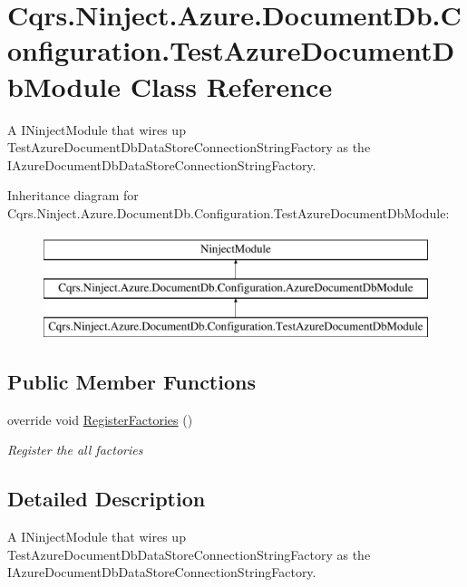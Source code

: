 \hypertarget{classCqrs_1_1Ninject_1_1Azure_1_1DocumentDb_1_1Configuration_1_1TestAzureDocumentDbModule}{}\section{Cqrs.\+Ninject.\+Azure.\+Document\+Db.\+Configuration.\+Test\+Azure\+Document\+Db\+Module Class Reference}
\label{classCqrs_1_1Ninject_1_1Azure_1_1DocumentDb_1_1Configuration_1_1TestAzureDocumentDbModule}


A I\+Ninject\+Module that wires up Test\+Azure\+Document\+Db\+Data\+Store\+Connection\+String\+Factory as the I\+Azure\+Document\+Db\+Data\+Store\+Connection\+String\+Factory.  


Inheritance diagram for Cqrs.\+Ninject.\+Azure.\+Document\+Db.\+Configuration.\+Test\+Azure\+Document\+Db\+Module\+:\begin{figure}[H]
\begin{center}
\leavevmode
\includegraphics[height=3.000000cm]{classCqrs_1_1Ninject_1_1Azure_1_1DocumentDb_1_1Configuration_1_1TestAzureDocumentDbModule}
\end{center}
\end{figure}
\subsection*{Public Member Functions}
\begin{DoxyCompactItemize}
\item 
override void \hyperlink{classCqrs_1_1Ninject_1_1Azure_1_1DocumentDb_1_1Configuration_1_1TestAzureDocumentDbModule_a9bd41611cfee1edc8a88815c366fccae_a9bd41611cfee1edc8a88815c366fccae}{Register\+Factories} ()
\begin{DoxyCompactList}\small\item\em Register the all factories \end{DoxyCompactList}\end{DoxyCompactItemize}


\subsection{Detailed Description}
A I\+Ninject\+Module that wires up Test\+Azure\+Document\+Db\+Data\+Store\+Connection\+String\+Factory as the I\+Azure\+Document\+Db\+Data\+Store\+Connection\+String\+Factory. 



